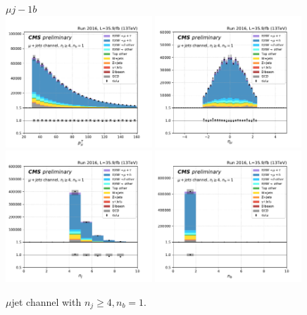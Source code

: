 \begin{figure}[ht]
    \centering
    $\mu j- 1b$ \\
    \includegraphics[width=0.49\textwidth]{chapters/Appendix/sectionPlots/figures/kinematics_pickles/mu4j/1b/mu4j_1b_lepton1_pt.pdf}
    \includegraphics[width=0.49\textwidth]{chapters/Appendix/sectionPlots/figures/kinematics_pickles/mu4j/1b/mu4j_1b_lepton1_eta.pdf}
    \includegraphics[width=0.49\textwidth]{chapters/Appendix/sectionPlots/figures/kinematics_pickles/mu4j/1b/mu4j_1b_nJets.pdf}
    \includegraphics[width=0.49\textwidth]{chapters/Appendix/sectionPlots/figures/kinematics_pickles/mu4j/1b/mu4j_1b_nBJets.pdf}
    
    \caption{$\mu$jet channel with $n_j\geq4, n_b=1$.}
\end{figure}

